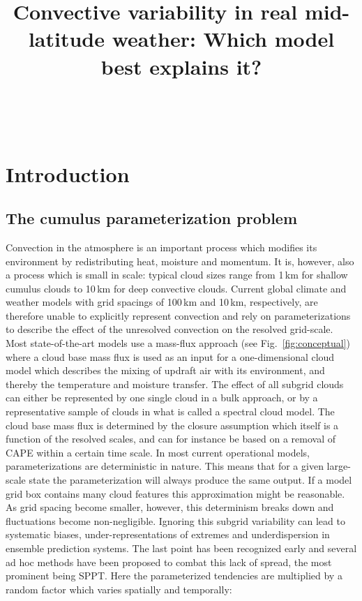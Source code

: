 \documentclass[a4paper, 12pt]{article}
\title{Convective variability in real mid-latitude weather: Which model best explains it?}
\begin{document}
\maketitle\

\tableofcontents
	
\section{Introduction}

\subsection{The cumulus parameterization problem}

Convection in the atmosphere is an important process which modifies its environment by redistributing heat, moisture and momentum. It is, however, also a process which is small in scale: typical cloud sizes range from 1\,km for shallow cumulus clouds to 10\,km for deep convective clouds. Current global climate and weather models with grid spacings of 100\,km and 10\,km, respectively, are therefore unable to explicitly represent convection and rely on parameterizations to describe the effect of the unresolved convection on the resolved grid-scale. Most state-of-the-art models use a mass-flux approach (see Fig.~\ref{fig:conceptual}) where a cloud base mass flux is used as an input for a one-dimensional cloud model which describes the mixing of updraft air with its environment, and thereby the temperature and moisture transfer. The effect of all subgrid clouds can either be represented by one single cloud in a bulk approach, or by a representative sample of clouds in what is called a spectral cloud model. The cloud base mass flux is determined by the closure assumption which itself is a function of the resolved scales, and can for instance be based on a removal of CAPE within a certain time scale. In most current operational models, parameterizations are deterministic in nature. This means that for a given large-scale state the parameterization will always produce the same output. If a model grid box contains many cloud features this approximation might be reasonable. As grid spacing become smaller, however, this determinism breaks down and fluctuations become non-negligible. Ignoring this subgrid variability can lead to systematic biases, under-representations of extremes and underdispersion in ensemble prediction systems. The last point has been recognized early and several ad hoc methods have been proposed to combat this lack of spread, the most prominent being SPPT. Here the parameterized tendencies are multiplied by a random factor which varies spatially and temporally: 
\end{document}
